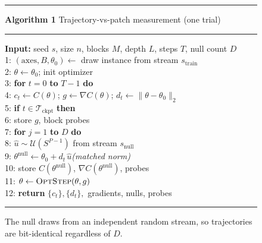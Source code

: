 \documentclass[conference]{IEEEtran}%
\begin{document}
\begin{figure}[t]
\hrule\vspace{3pt}
\footnotesize
\textbf{Algorithm 1} Trajectory-vs-patch measurement (one trial)
\vspace{2pt}\hrule\vspace{3pt}
\footnotesize
\textbf{Input:} seed $s$, size $n$, blocks $M$, depth $L$, steps $T$, null count $D$\\
1: $(\text{axes},B,\theta_0)\leftarrow$ draw instance from stream $s_{\text{train}}$\\
2: $\theta\leftarrow\theta_0$;\; init optimizer\\
3: \textbf{for} $t=0$ \textbf{to} $T-1$ \textbf{do}\\
4: \hspace{1em} $c_t\leftarrow C(\theta)$;\; $g\leftarrow\nabla C(\theta)$;\; $d_t\leftarrow\lVert\theta-\theta_0\rVert_2$\\
5: \hspace{1em} \textbf{if} $t\in\mathcal{T}_{\text{ckpt}}$ \textbf{then}\\
6: \hspace{2em} store $g$, block probes\\
7: \hspace{2em} \textbf{for} $j=1$ \textbf{to} $D$ \textbf{do}\\
8: \hspace{3em} $\hat u\sim\mathcal{U}(S^{P-1})$ from stream $s_{\text{null}}$\\
9: \hspace{3em} $\theta^{\text{null}}\leftarrow\theta_0+d_t\,\hat u$\hfill\emph{(matched norm)}\\
10: \hspace{3em} store $C(\theta^{\text{null}})$, $\nabla C(\theta^{\text{null}})$, probes\\
11: \hspace{1em} $\theta\leftarrow\textsc{OptStep}(\theta,g)$\\
12: \textbf{return} $\{c_t\},\{d_t\},$ gradients, nulls, probes
\vspace{3pt}\hrule
\caption{The null draws from an independent random stream, so trajectories are bit-identical regardless of $D$.}
\label{alg:protocol}
\end{figure}
\end{document}
